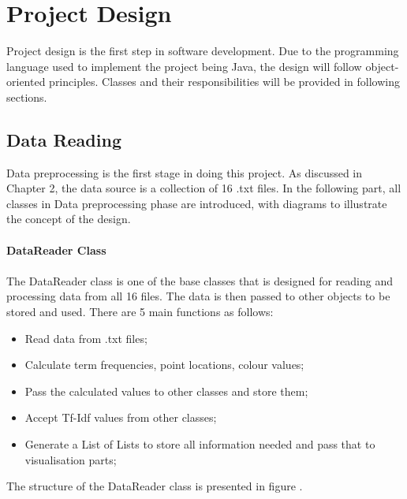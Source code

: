\clearpage
\section{Project Design}
Project design is the first step in software development. Due to the programming language used to implement the project being Java, the design will follow object-oriented principles. Classes and their responsibilities will be provided in following sections.

\subsection{Data Reading}
Data preprocessing is the first stage in doing this project. As discussed in Chapter 2, the data source is a collection of 16 .txt files. In the following part, all classes in Data preprocessing phase are introduced, with diagrams to illustrate the concept of the design.

\paragraph{DataReader Class}

\paragraph[]{}The DataReader class is one of the base classes that is designed for reading and processing data from all 16 files. The data is then passed to other objects to be stored and used. There are 5 main functions as follows:

\begin{itemize}
	\item \textbf{}Read data from .txt files;
	\item \textbf{}Calculate term frequencies, point locations, colour values; 
	\item \textbf{}Pass the calculated values to other classes and store them;
	\item \textbf{}Accept Tf-Idf values from other classes;
	\item \textbf{}Generate a List of Lists to store all information needed and pass that to visualisation parts;
\end{itemize} 

The structure of the DataReader class is presented in figure \label{dataReader}.

